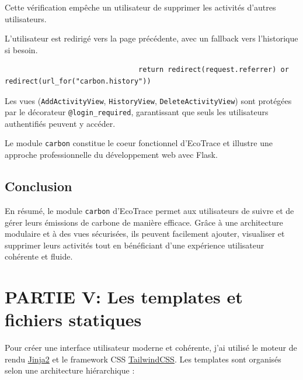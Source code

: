 \documentclass[a4paper,11pt]{article}
\begin{document}
\begin{enumerate}
                        \noindent Cette vérification empêche un utilisateur de supprimer les activités d'autres utilisateurs.

                        \noindent L'utilisateur est redirigé vers la page précédente, avec un fallback vers l'historique si besoin.

                        \begin{tcolorbox}[colback=lightgray!6, colframe=black, left=-50mm, right=5mm, top=2mm, bottom=0mm, boxrule=0.1mm]
                            \begin{verbatim}
                                return redirect(request.referrer) or redirect(url_for("carbon.history"))
                            \end{verbatim}
                        \end{tcolorbox}
                \end{enumerate}

                \noindent Les vues (\texttt{AddActivityView}, \texttt{HistoryView}, \texttt{DeleteActivityView}) sont protégées par le décorateur \texttt{@login\_required}, garantissant que seuls les utilisateurs authentifiés peuvent y accéder.

                \noindent Le module \texttt{carbon} constitue le coeur fonctionnel d'EcoTrace et illustre une approche professionnelle du développement web avec Flask.

            \subsection{Conclusion}
                \begin{tcolorbox}[colback=lightgray!6, colframe=black, left=2mm, right=5mm, top=2mm, bottom=0mm, boxrule=0.1mm]
                    En résumé, le module \texttt{carbon} d'EcoTrace permet aux utilisateurs de suivre et de gérer leurs émissions de carbone de manière efficace. Grâce à une architecture modulaire et à des vues sécurisées, ils peuvent facilement ajouter, visualiser et supprimer leurs activités tout en bénéficiant d'une expérience utilisateur cohérente et fluide.
                \end{tcolorbox}


        \newpage
        \section{PARTIE V: Les templates et fichiers statiques}
            \noindent Pour créer une interface utilisateur moderne et cohérente, j'ai utilisé le moteur de rendu \href{https://jinja.palletsprojects.com/}{Jinja2} et le framework CSS \href{https://tailwindcss.com/}{TailwindCSS}. Les templates sont organisés selon une architecture hiérarchique :
\end{document}
